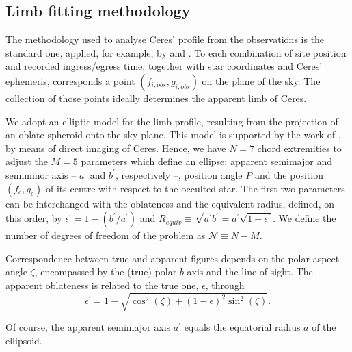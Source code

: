 \documentclass[useAMS,usenatbib]{mn2e}
\begin{document}
\subsection{Limb fitting methodology}

The methodology used to analyse Ceres' profile from the observations is the standard one, applied, for example, by \cite{Ortiz2012} and \cite{BragaRibas2013}. To each combination of site position and recorded ingress/egress time, together with star coordinates and Ceres' ephemeris, corresponds a point $(f_{i,obs},g_{i,obs})$ on the plane of the sky. The collection of those points ideally determines the apparent limb of Ceres.

We adopt an elliptic model for the limb profile, resulting from the projection of an oblate spheroid onto the sky plane. This model is supported by the work of \cite{Drummond2014}, by means of direct imaging of Ceres. Hence, we have $N=7$ chord extremities to adjust the $M=5$ parameters which define an ellipse: apparent semimajor and semiminor axis -- $a^\prime$ and $b^\prime$, respectively --, position angle $P$ and the position $(f_c,g_c)$ of its centre with respect to the occulted star. The first two parameters can be interchanged with the oblateness and the equivalent radius, defined, on this order, by $\epsilon^\prime = 1 - (b^\prime/a^\prime)$ and $R_{equiv} \equiv \sqrt{a^\prime b^\prime} = a^\prime\sqrt{1-\epsilon^\prime}$. We define the number of degrees of freedom of the problem as $\mathcal{N} \equiv N - M$.

Correspondence between true and apparent figures depends on the polar aspect angle $\zeta$, encompassed by the (true) polar $b$-axis and the line of sight. The apparent oblateness is related to the true one, $\epsilon$, through
%
\begin{equation}
\epsilon^\prime = 1 - \sqrt{\cos^2(\zeta) + (1-\epsilon)^2\sin^2(\zeta)}.
\end{equation}

Of course, the apparent semimajor axis $a^\prime$ equals the equatorial radius $a$ of the ellipsoid. %
\end{document}
